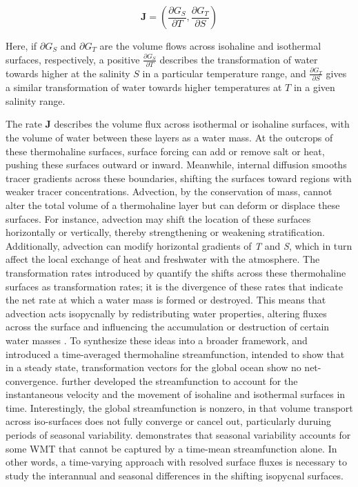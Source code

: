 \documentclass[draft]{agujournal2019}
\begin{document}
\[
\mathbf{J} = 
\left( \frac{\partial G_S}{\partial T}, \frac{\partial G_T}{\partial S} \right)
\]

Here, if $\partial G_S$ and $\partial G_T$ are the volume flows across isohaline and isothermal surfaces, respectively, a positive $\frac{\partial G_S}{\partial T}$ describes the transformation of water towards higher at the salinity $S$ in a particular temperature range, and $\frac{\partial G_T}{\partial S}$ gives a similar transformation of water towards higher temperatures at $T$ in a given salinity range.

The rate $\mathbf{J}$ describes the volume flux across isothermal or isohaline surfaces, with the volume of water between these layers as a water mass. At the outcrops of these thermohaline surfaces, surface forcing can add or remove salt or heat, pushing these surfaces outward or inward. Meanwhile, internal diffusion smooths tracer gradients across these boundaries, shifting the surfaces toward regions with weaker tracer concentrations. Advection, by the conservation of mass, cannot alter the total volume of a thermohaline layer but can deform or displace these surfaces. For instance, advection may shift the location of these surfaces horizontally or vertically, thereby strengthening or weakening stratification. Additionally, advection can modify horizontal gradients of \emph{T} and \emph{S}, which in turn affect the local exchange of heat and freshwater with the atmosphere. The transformation rates introduced by  quantify the shifts across these thermohaline surfaces as transformation rates; it is the divergence of these rates that indicate the net rate at which a water mass is formed or destroyed. This means that advection acts isopycnally by redistributing water properties, altering fluxes across the surface and influencing the accumulation or destruction of certain water masses \cite{Maze2009}. To synthesize these ideas into a broader framework,  and  introduced a time-averaged thermohaline streamfunction, intended to show that in a steady state, transformation vectors for the global ocean show no net-convergence.  further developed the streamfunction to account for the instantaneous velocity and the movement of isohaline and isothermal surfaces in time. Interestingly, the global streamfunction is nonzero, in that volume transport across iso-surfaces does not fully converge or cancel out, particularly duruing periods of seasonal variability.  demonstrates that seasonal variability accounts for some WMT that cannot be captured by a time-mean streamfunction alone. In other words, a time-varying approach with resolved surface fluxes is necessary to study the interannual and seasonal differences in the shifting isopycnal surfaces.
\end{document}
